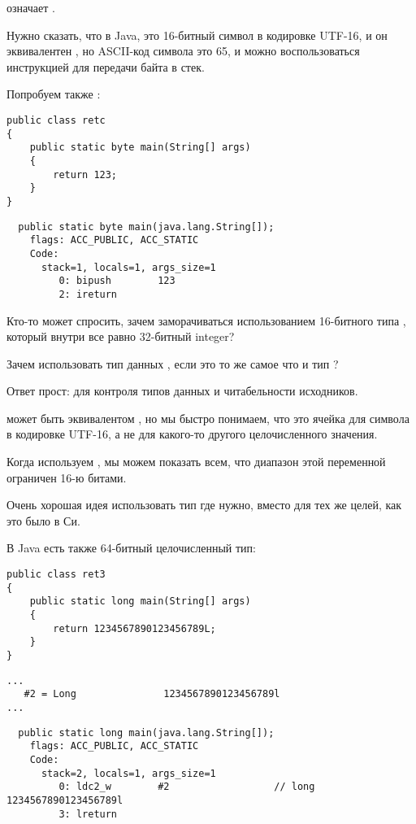  означает .

Нужно сказать, что  в Java, это 16-битный символ в кодировке UTF-16,
и он эквивалентен , но ASCII-код символа  это 65, и можно воспользоваться
инструкцией для передачи байта в стек.

Попробуем также :

\begin{lstlisting}
public class retc
{
	public static byte main(String[] args) 
	{
		return 123;
	}
}
\end{lstlisting}

\begin{lstlisting}
  public static byte main(java.lang.String[]);
    flags: ACC_PUBLIC, ACC_STATIC
    Code:
      stack=1, locals=1, args_size=1
         0: bipush        123
         2: ireturn       
\end{lstlisting}

Кто-то может спросить, зачем заморачиваться использованием 16-битного типа , который
внутри все равно 32-битный integer?

Зачем использовать тип данных , если это то же самое что и тип ?

Ответ прост: для контроля типов данных и читабельности исходников.

 может быть эквивалентом , но мы быстро понимаем, что это ячейка
для символа в кодировке UTF-16, а не для какого-то другого целочисленного значения.

Когда используем , мы можем показать всем, что диапазон этой переменной 
ограничен 16-ю битами.

Очень хорошая идея использовать тип  где нужно, 
вместо  для тех же целей, как это было в Си.

В Java есть также 64-битный целочисленный тип:

\begin{lstlisting}
public class ret3
{
	public static long main(String[] args)
	{
		return 1234567890123456789L;
	}
}
\end{lstlisting}

\begin{lstlisting}[caption=Constant pool]
...
   #2 = Long               1234567890123456789l
...
\end{lstlisting}

\begin{lstlisting}
  public static long main(java.lang.String[]);
    flags: ACC_PUBLIC, ACC_STATIC
    Code:
      stack=2, locals=1, args_size=1
         0: ldc2_w        #2                  // long 1234567890123456789l
         3: lreturn       
\end{lstlisting}

